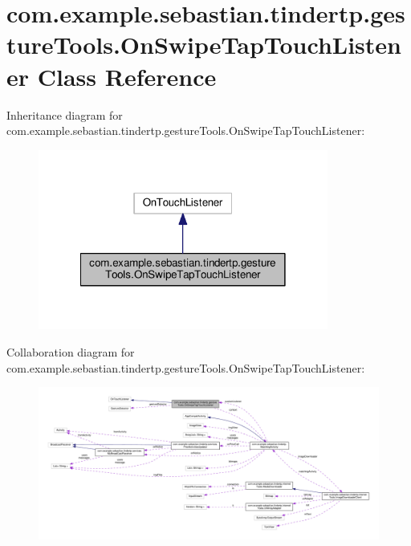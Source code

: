 \hypertarget{classcom_1_1example_1_1sebastian_1_1tindertp_1_1gestureTools_1_1OnSwipeTapTouchListener}{}\section{com.\+example.\+sebastian.\+tindertp.\+gesture\+Tools.\+On\+Swipe\+Tap\+Touch\+Listener Class Reference}
\label{classcom_1_1example_1_1sebastian_1_1tindertp_1_1gestureTools_1_1OnSwipeTapTouchListener}


Inheritance diagram for com.\+example.\+sebastian.\+tindertp.\+gesture\+Tools.\+On\+Swipe\+Tap\+Touch\+Listener\+:\nopagebreak
\begin{figure}[H]
\begin{center}
\leavevmode
\includegraphics[width=270pt]{classcom_1_1example_1_1sebastian_1_1tindertp_1_1gestureTools_1_1OnSwipeTapTouchListener__inherit__graph}
\end{center}
\end{figure}


Collaboration diagram for com.\+example.\+sebastian.\+tindertp.\+gesture\+Tools.\+On\+Swipe\+Tap\+Touch\+Listener\+:
\nopagebreak
\begin{figure}[H]
\begin{center}
\leavevmode
\includegraphics[width=350pt]{classcom_1_1example_1_1sebastian_1_1tindertp_1_1gestureTools_1_1OnSwipeTapTouchListener__coll__graph}
\end{center}
\end{figure}
